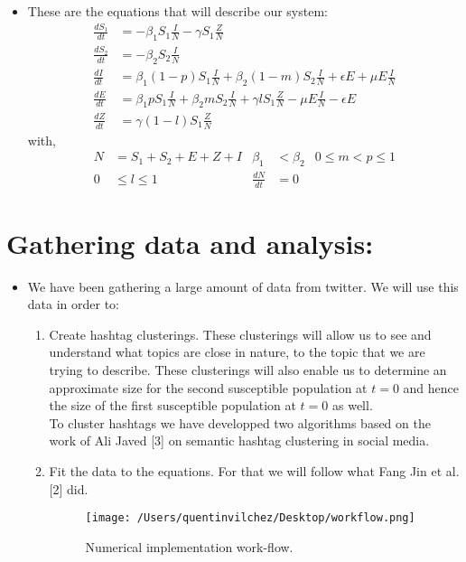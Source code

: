\documentclass{article}
\begin{document}
\begin{itemize}
\item These are the equations that will describe our system:
\begin{equation} 
\begin{split}
\frac{dS_1}{dt} &= -{\beta}_1 S_1\frac{I}{N} -\gamma S_1\frac{Z}{N}\\
\frac{dS_2}{dt} &= -{\beta}_2 S_2\frac{I}{N}\\
\frac{dI}{dt} &= {\beta}_1 (1-p)S_1\frac{I}{N} + {\beta}_2 (1-m)S_2\frac{I}{N} + \epsilon E + \mu E\frac{I}{N}\\
\frac{dE}{dt} &= {\beta}_1 pS_1\frac{I}{N} + {\beta}_2 mS_2\frac{I}{N} + \gamma       lS_1\frac{Z}{N} - \mu E\frac{I}{N} - \epsilon E\\
\frac{dZ}{dt} &=  \gamma (1-l)S_1\frac{Z}{N}
\end{split}
\end{equation}
with,
\begin{align*}
 N& = S_1 + S_2 + E + Z + I & {\beta}_1 &< {\beta}_2  & 0\leq m<p\leq 1\\
0&\leq l \leq 1  & \frac{dN}{dt}&=0
\end{align*}
\end{itemize}
\section{Gathering data and analysis:}
\begin{itemize}
\item We have been gathering a large amount of data from twitter. We will use this data in order to:
\begin{enumerate}
\item Create hashtag clusterings. These clusterings will allow us to see and understand what topics are close in nature, to the topic that we are trying to describe. These clusterings will also enable us to determine an approximate size for the second susceptible population at $t=0$ and hence the size of the first susceptible population at $t=0$ as well.
\\To cluster hashtags we have developped two algorithms based on the work of Ali Javed [3] on semantic hashtag clustering in social media. 
\item Fit the data to the equations. For that we will follow what Fang Jin et al. [2] did. 
\begin{figure}[h]

\centering
\texttt{[image: /Users/quentinvilchez/Desktop/workflow.png]}
\caption{Numerical implementation work-flow.}
\end{figure}
\end{enumerate}

\end{itemize}
\end{document}
